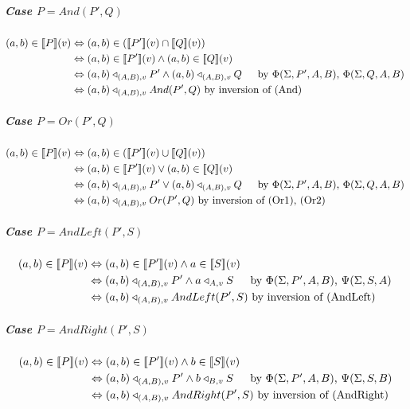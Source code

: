 \documentclass[12pt,a4paper,twoside,openright]{report}
\newcommand{\db}[1]{{\bf [\![}#1{\bf ]\!]}}
\newcommand{\deno}[1]{\db{#1}(v)}
\newcommand{\denoRule}[2]{#1 \in \deno{#2}}
\newcommand{\opRule}[3]{#1 \triangleleft_{#2, v} #3}
\newcommand{\phiRule}[3]{\Phi(\Sigma, #1, #2, #3)}
\newcommand{\psiRule}[2]{\Psi(\Sigma, #1, #2)}
\begin{document}
\subparagraph{Case $P = And(P', Q)$}
\begin{equation} \label{case And(P', Q)}
\begin{split}
\denoRule{(a, b)}{P} & \Leftrightarrow (a, b) \in (\deno{P'} \cap \deno{Q})\\
					& \Leftrightarrow \denoRule{(a, b)}{P'} \wedge \denoRule{(a, b)}{Q}\\
					&\Leftrightarrow \opRule{(a,b)}{(A, B)}{P'} \wedge \opRule{(a,b)}{(A, B)}{Q}\indent\mbox{by $\phiRule{P'}{A}{B}$, $\phiRule{Q}{A}{B}$} \\
					& \Leftrightarrow \opRule{(a, b)}{(A, B)}{And(P', Q)} \mbox{ by inversion of (And)}\\
\end{split}
\end{equation}

\subparagraph{Case $P = Or(P', Q)$}
\begin{equation} \label{case Or(P', Q)}
\begin{split}
\denoRule{(a, b)}{P} & \Leftrightarrow (a, b) \in (\deno{P'} \cup \deno{Q})\\
					& \Leftrightarrow \denoRule{(a, b)}{P'} \vee \denoRule{(a, b)}{Q}\\
					&\Leftrightarrow \opRule{(a,b)}{(A, B)}{P'} \vee \opRule{(a,b)}{(A, B)}{Q}\indent\mbox{by $\phiRule{P'}{A}{B}$, $\phiRule{Q}{A}{B}$} \\
					& \Leftrightarrow \opRule{(a, b)}{(A, B)}{Or(P', Q)} \mbox{ by inversion of (Or1), (Or2)}\\\end{split}
\end{equation}

\subparagraph{Case $P = AndLeft(P', S)$}
\begin{equation} \label{case AndLeft(P', Q)}
\begin{split}
\denoRule{(a, b)}{P} & \Leftrightarrow \denoRule{(a, b)}{P'} \wedge \denoRule{a}{S}\\
					&\Leftrightarrow \opRule{(a,b)}{(A, B)}{P'} \wedge \opRule{a}{A}{S}\indent\mbox{by $\phiRule{P'}{A}{B}$, $\psiRule{S}{A}$} \\
					& \Leftrightarrow \opRule{(a, b)}{(A, B)}{AndLeft(P', S)} \mbox{ by inversion of (AndLeft)}\\\end{split}
\end{equation}

\subparagraph{Case $P = AndRight(P', S)$}
\begin{equation} \label{case AndRight(P', Q)}
\begin{split}
\denoRule{(a, b)}{P} & \Leftrightarrow \denoRule{(a, b)}{P'} \wedge \denoRule{b}{S}\\
					&\Leftrightarrow \opRule{(a,b)}{(A, B)}{P'} \wedge \opRule{b}{B}{S}\indent\mbox{by $\phiRule{P'}{A}{B}$, $\psiRule{S}{B}$} \\
					& \Leftrightarrow \opRule{(a, b)}{(A, B)}{AndRight(P', S)} \mbox{ by inversion of (AndRight)}\\\end{split}
\end{equation}
\end{document}

